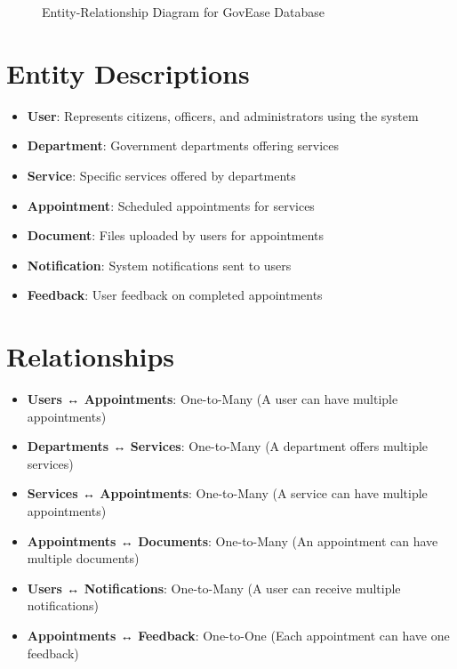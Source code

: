 \documentclass[12pt,a4paper]{article}
\begin{document}
\begin{figure}[h!]
\caption{Entity-Relationship Diagram for GovEase Database}
\label{fig:er_diagram}
\end{figure}

\section{Entity Descriptions}

\begin{itemize}
\item \textbf{User}: Represents citizens, officers, and administrators using the system
\item \textbf{Department}: Government departments offering services
\item \textbf{Service}: Specific services offered by departments
\item \textbf{Appointment}: Scheduled appointments for services
\item \textbf{Document}: Files uploaded by users for appointments
\item \textbf{Notification}: System notifications sent to users
\item \textbf{Feedback}: User feedback on completed appointments
\end{itemize}

\section{Relationships}

\begin{itemize}
\item \textbf{Users ↔ Appointments}: One-to-Many (A user can have multiple appointments)
\item \textbf{Departments ↔ Services}: One-to-Many (A department offers multiple services)
\item \textbf{Services ↔ Appointments}: One-to-Many (A service can have multiple appointments)
\item \textbf{Appointments ↔ Documents}: One-to-Many (An appointment can have multiple documents)
\item \textbf{Users ↔ Notifications}: One-to-Many (A user can receive multiple notifications)
\item \textbf{Appointments ↔ Feedback}: One-to-One (Each appointment can have one feedback)
\end{itemize}
\end{document}
